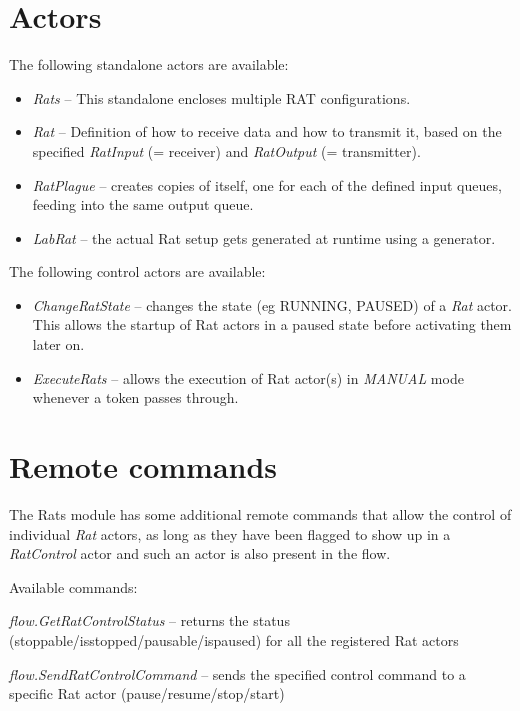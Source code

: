 \documentclass[a4paper]{book}
\begin{document}
\section{Actors}
The following standalone actors are available:
\begin{itemize}
	\item \textit{Rats} -- This standalone encloses multiple RAT configurations.
	\item \textit{Rat} -- Definition of how to receive data and how to transmit 
	it, based on the specified \textit{RatInput} (= receiver) and 
	\textit{RatOutput} (= transmitter).
	\item \textit{RatPlague} -- creates copies of itself, one for each of
	the defined input queues, feeding into the same output queue.
	\item \textit{LabRat} -- the actual Rat setup gets generated at runtime
	using a generator.
\end{itemize}
The following control actors are available:
\begin{itemize}
	\item \textit{ChangeRatState} -- changes the state (eg RUNNING, PAUSED)
	of a \textit{Rat} actor. This allows the startup of Rat actors in a
	paused state before activating them later on.
	\item \textit{ExecuteRats} -- allows the execution of Rat actor(s) in
	\textit{MANUAL} mode whenever a token passes through.
\end{itemize}


\section{Remote commands}
The Rats module has some additional remote commands that allow the control of
individual \textit{Rat} actors, as long as they have been flagged to show up in a
\textit{RatControl} actor and such an actor is also present in the flow.

Available commands:
\begin{tight_itemize}
  \item \textit{flow.GetRatControlStatus} -- returns the status
  (stoppable/isstopped/pausable/ispaused) for all the registered Rat actors
  \item \textit{flow.SendRatControlCommand} -- sends the specified control command
  to a specific Rat actor (pause/resume/stop/start)
\end{tight_itemize}
\end{document}
